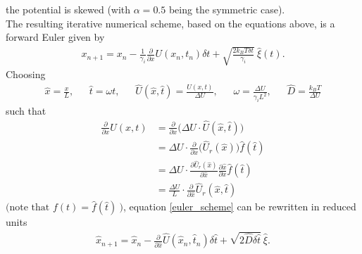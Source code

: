 \documentclass[11pt,a4paper]{article}
\begin{document}
the potential is skewed (with $\alpha = 0.5$ being the symmetric case). \\
%
The resulting iterative numerical scheme, based on the equations above, is a forward Euler given by
\begin{align}
   x_{n+1} = x_n - \frac{1}{\gamma_i} \frac{\partial}{\partial x} U(x_n,t_n) \delta t
                  + \sqrt{ \frac{2 k_B T \delta t}{\gamma_i} } \: \hat{\xi} (t).
\label{euler_scheme}
\end{align}
Choosing 
\begin{align}
   \hat{x} = \frac{x}{L}, \:\:\:\:\:\:\:
   \hat{t} = \omega t,    \:\:\:\:\:\:\:
   \hat{U}(\hat{x},\hat{t})=\frac{U(x,t)}{\Delta U}, \:\:\:\:\:\:\:
   \omega = \frac{\Delta U}{\gamma_i L^2}, \:\:\:\:\:\:\:
   \hat{D} = \frac{k_B T}{ \Delta U}
\end{align}
such that
\begin{align*}
   \frac{\partial}{\partial x} U(x,t)
   &= \frac{\partial}{\partial x} \big( \Delta U \cdot \hat{U}(\hat{x}, \hat{t}) \big) \\
   &= \Delta U \cdot \frac{\partial}{\partial x} \big( \hat{U}_r(\hat{x})\big) \hat{f}(\hat{t}) \\
   &= \Delta U \cdot \frac{\partial \hat{U}_r(\hat{x})}{\partial \hat{x}}  \frac{\partial \hat{x}}{\partial x} \hat{f}(\hat{t}) \\
   &= \frac{\Delta U}{L} \cdot \frac{\partial}{\partial \hat{x}} \hat{U}_r(\hat{x}, \hat{t})
\end{align*}
$\big( \text{note that } f(t) = \hat{f}(\hat{t}) \: \big)$, equation \eqref{euler_scheme} can be rewritten in reduced units
\begin{align}
   \hat{x}_{n+1} = \hat{x}_n - \frac{\partial}{\partial \hat{x}} \hat{U}(\hat{x}_n,\hat{t}_n) \delta \hat{t}
   + \sqrt{ 2 \hat{D} \delta \hat{t} } \: \hat{\xi}.
\label{reduced_euler_scheme}
\end{align}
\end{document}
